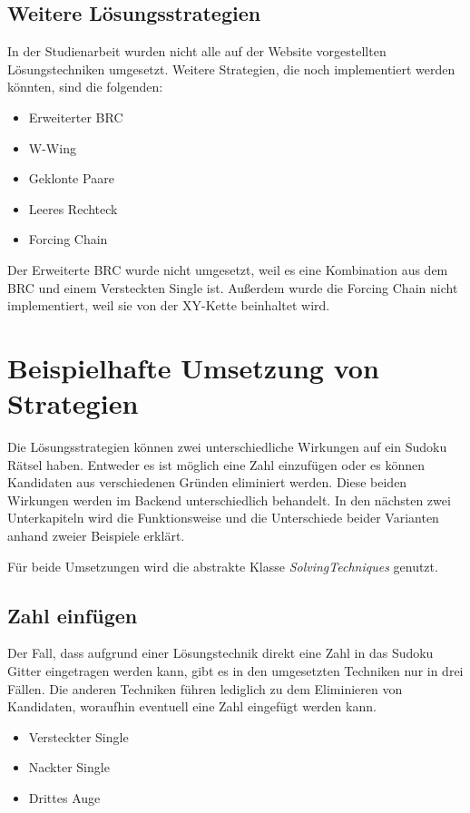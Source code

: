 \subsection{Weitere Lösungsstrategien}
In der Studienarbeit wurden nicht alle auf der Website \cite{martin} vorgestellten Lösungstechniken umgesetzt. Weitere Strategien, die noch implementiert werden könnten, sind die folgenden:
\begin{itemize}
	\item Erweiterter \ac{BRC}
	\item W-Wing
	\item Geklonte Paare
	\item Leeres Rechteck
	\item Forcing Chain
\end{itemize}

Der Erweiterte \ac{BRC} wurde nicht umgesetzt, weil es eine Kombination aus dem \ac{BRC} und einem Versteckten Single ist. Außerdem wurde die Forcing Chain nicht implementiert, weil sie von der XY-Kette beinhaltet wird.

\section{Beispielhafte Umsetzung von Strategien}
Die Lösungsstrategien können zwei unterschiedliche Wirkungen auf ein Sudoku Rätsel haben. Entweder es ist möglich eine Zahl einzufügen oder es können Kandidaten aus verschiedenen Gründen eliminiert werden. Diese beiden Wirkungen werden im Backend unterschiedlich behandelt. In den nächsten zwei Unterkapiteln wird die Funktionsweise und die Unterschiede beider Varianten anhand zweier Beispiele erklärt. 

Für beide Umsetzungen wird die abstrakte Klasse \textit{SolvingTechniques} genutzt.

\subsection{Zahl einfügen}

Der Fall, dass aufgrund einer Lösungstechnik direkt eine Zahl in das Sudoku Gitter eingetragen werden kann, gibt es in den umgesetzten Techniken nur in drei Fällen. Die anderen Techniken führen lediglich zu dem Eliminieren von Kandidaten, woraufhin eventuell eine Zahl eingefügt werden kann.
\begin{itemize}
	\item Versteckter Single
	\item Nackter Single
	\item Drittes Auge
\end{itemize}

